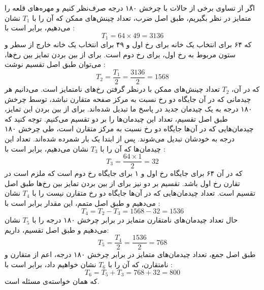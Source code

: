 \p
اگر از تساوی برخی از حالات با چرخش ۱۸۰ درجه صرف‌نظر کنیم و مهره‌های قلعه را متمایز در نظر بگیریم،
طبق اصل ضرب، تعداد چینش‌های ممکن که آن را با $T_1$ نشان می‌دهیم، برابر است با :
  $$T_1 = 64 \times 49 = 3136$$
که ۶۴ برای انتخاب یک خانه برای رخ اول و ۴۹ برای انتخاب یک خانه خارج از سطر و ستون
مربوط به رخ اول، برای رخ دوم است. برای از بین بردن تمایز بین رخ‌ها، می‌توان طبق اصل تقسیم نوشت :
  $$T_2 = \frac{T_1}{2} = \frac{3136}{2} = 1568$$
  که در آن، $T_2$ تعداد چینش‌های ممکن با درنظر گرفتن رخ‌های نامتمایز است.
  \p
می‌دانیم هر چیدمانی که در آن جایگاه دو رخ نسبت به مرکز صفحه متقارن نباشد، توسط چرخش ۱۸۰ درجه به
یک چیدمان جدید در پاسخ ما تبدیل شده‌اند.
برای از بین بردن این تمایز، طبق اصل تقسیم، تعداد این چیدمان‌ها را بر دو تقسیم می‌کنیم.
توجه کنید که چیدمان‌هایی که در آن‌ها جایگاه دو رخ نسبت به مرکز متقارن است،
طی چرخش ۱۸۰ درجه به خودشان تبدیل می‌شوند. پس از ابتدا یک بار شمرده شده‌اند. تعداد این چیدمان‌ها
که آن را با $T_3$ نشان می‌دهیم، برابر است با : 
  $$T_3 = \frac{64 \times 1}{2} = 32$$
که در آن ۶۴ برای جایگاه رخ اول و ۱ برای جایگاه رخ دوم است که ملزم است در تقارن رخ اول باشد.
تقسیم بر دو نیز برای از بین بردن تمایز بین رخ‌ها طبق اصل تقسیم است.
تعداد چیدمان‌هایی که در آن‌ها جایگاه دو رخ متقارن نیست را با
$T_4$
نشان می‌دهیم و طبق اصل متمم، این مقدار برابر است با :
  $$T_4 = T_2 - T_3 = 1568 - 32 = 1536$$
  \p
حال تعداد چیدمان‌های نامتقارن متمایز در برابر چرخش ۱۸۰ درجه را با
$T_5$
نشان می‌دهیم و طبق اصل تقسیم، داریم:
  $$T_5 = \frac{T_4}{2} = \frac{1536}{2} = 768$$
  \p
طبق اصل جمع، تعداد چیدمان‌های متمایز در برابر چرخش ۱۸۰ درجه، اعم از متقارن و نامتقارن، که آن را با $T_6$ نشان خواهیم داد،
 برابر است با :
  $$T_6 = T_5 + T_3 = 768 + 32 = 800$$
  که همان خواسته‌ی مسئله است.